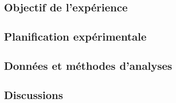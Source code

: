 \subsection{Objectif de l'expérience}

\subsection{Planification expérimentale}

\subsection{Données et méthodes d'analyses}

\subsection{Discussions}




